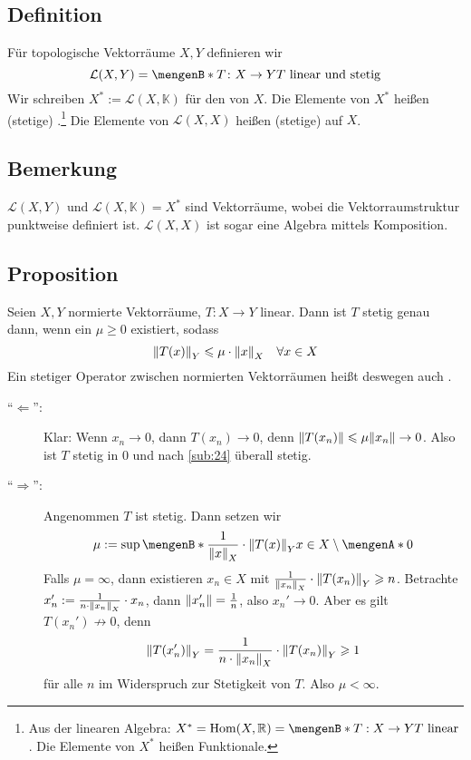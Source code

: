 \subsection[Definition: Stetige Funktionale und Operatoren]{Definition} %
\label{sub:25}
Für topologische Vektorräume $X,Y$ definieren wir 
\[
	\mathcal{L}(X,Y) = \set[T \colon X \to Y]{T \text{ linear und stetig}}  
\]
Wir schreiben $X^*:= \mathcal{L}(X,\mathds{K})$ für den  von $X$. Die Elemente von $X^*$ heißen (stetige) .\footnote{Aus der linearen Algebra: $X^* = \Hom(X,\mathds{R}) = \set[T : X \to Y]{T \text{ linear}}$. Die Elemente von $X^*$ heißen Funktionale.}
Die Elemente von $\mathcal{L}(X,X)$ heißen (stetige)  auf $X$. 

\subsection[Bemerkung: Vektorraumstruktur auf $\mathcal{L}(X,Y)$, Algebrastruktur auf $\mathcal{L}(X,X)$]{Bemerkung} %
\label{sub:26}
$\mathcal{L}(X,Y)$ und $\mathcal{L}(X,\mathds{K}) = X^*$ sind Vektorräume, wobei die Vektorraumstruktur punktweise definiert ist. $\mathcal{L}(X,X)$ ist sogar eine Algebra mittels Komposition.

\subsection[Proposition: Stetigkeit linearer Abbildungen mittels Normabschätzung]{Proposition} %
\label{sub:27}
Seien $X,Y$ normierte Vektorräume, $T \colon X \to Y$ linear. Dann ist $T$ stetig genau dann, wenn ein $\mu \ge 0$ existiert, sodass 
\[
	\norm[Y]{T(x)} \le \mu \cdot \norm[X]{x} \quad \forall x \in X  
\]
Ein stetiger Operator zwischen normierten Vektorräumen heißt deswegen auch .
\begin{description}
	\item[\enquote{$\Leftarrow$}:] Klar: Wenn $x_n \to 0$, dann $T(x_n) \to 0$, denn $\norm{T(x_n)} \le \mu \norm{x_n } \to 0$. Also ist $T$ stetig in $0$ und nach
	\ref{sub:24} überall stetig.
	\item[\enquote{$\Rightarrow $}:] Angenommen $T$ ist stetig. Dann setzen wir
	\[
		\mu := \sup \set[{\frac{1}{\norm[X]{x}} \cdot \norm[Y]{T(x)}  }]{x \in X \setminus \set{0} } 
	\] 
	Falls $\mu = \infty$, dann existieren $x_n \in X$ mit $\frac{1}{\norm[X]{x_n}} \cdot \norm[Y]{T(x_n)} \ge n$. Betrachte 
	$x_n' :=  \frac{1}{n \cdot \norm[X]{x_n}} \cdot x_n $, dann $\norm{x_n'} = \frac{1}{n}$, also $x_n' \to 0$. Aber es gilt $T(x_n')\not\longrightarrow 0$, denn
	\begin{align*}
		\norm[Y]{T(x_n')} = \frac{1}{n \cdot \norm[X]{x_n} } \cdot \norm[Y]{T(x_n)} \ge 1 
	\end{align*}
	für alle $n$ im Widerspruch zur Stetigkeit von $T$. Also $\mu < \infty$. \bewende 
\end{description}


